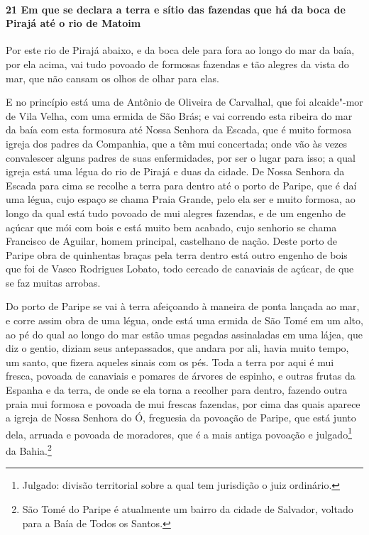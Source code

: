 \begin{linenumbers}
\paragraph{21 Em que se declara a terra e sítio das fazendas que há da boca de Pirajá até
o rio de Matoim}\quad
Por este rio de Pirajá abaixo, e da boca dele para fora ao longo do mar da baía, por ela
acima, vai tudo povoado de formosas fazendas e tão alegres da vista do mar, que não cansam
os olhos de olhar para elas.

E no princípio está uma de Antônio de Oliveira de Carvalhal, que foi alcaide"-mor de Vila
Velha, com uma ermida de São Brás; e vai correndo esta ribeira do mar da baía com esta
formosura até Nossa \EP[1] Senhora da Escada, que é muito formosa igreja dos padres da
Companhia, que a têm mui concertada; onde vão às vezes convalescer alguns padres de suas
enfermidades, por ser o lugar para isso; a qual igreja está uma légua do rio de Pirajá e
duas da cidade. De Nossa Senhora da Escada para cima se recolhe a terra para dentro até o
porto de Paripe, que é daí uma légua, cujo espaço se chama Praia Grande, pelo ela ser e
muito formosa, ao longo da qual está tudo povoado de mui alegres fazendas, e de um engenho
de açúcar que mói com bois e está muito bem acabado, cujo senhorio se chama Francisco de
Aguilar, homem principal, castelhano de nação. Deste porto de Paripe obra de quinhentas
braças pela terra dentro está outro engenho de bois que foi de Vasco Rodrigues Lobato,
todo cercado de canaviais de açúcar, de que se faz muitas arrobas.

Do porto de Paripe se vai à terra afeiçoando à maneira de ponta lançada ao mar, e corre
assim obra de uma légua, onde está uma ermida de São Tomé em um alto, ao pé do qual ao
longo do mar estão umas pegadas assinaladas em uma lájea, que diz o gentio, diziam seus
antepassados, que andara por ali, havia muito tempo, um santo, que fizera aqueles sinais
com os pés. Toda a terra por aqui é mui fresca, povoada de canaviais e pomares de árvores
de espinho, e outras frutas da Espanha e da terra, de onde se ela torna a recolher para
dentro, fazendo outra praia mui formosa e povoada de mui frescas fazendas, por cima das
quais aparece a igreja de Nossa Senhora do Ó, freguesia da povoação de Paripe, que está
junto dela, arruada e povoada de moradores, que é a mais antiga povoação e
julgado\footnote{ Julgado: divisão territorial sobre a qual tem jurisdição o juiz
ordinário.} da Bahia.\footnote{ São Tomé do Paripe é atualmente um bairro da cidade de
Salvador, voltado para a Baía de Todos os Santos.}


\end{linenumbers}
